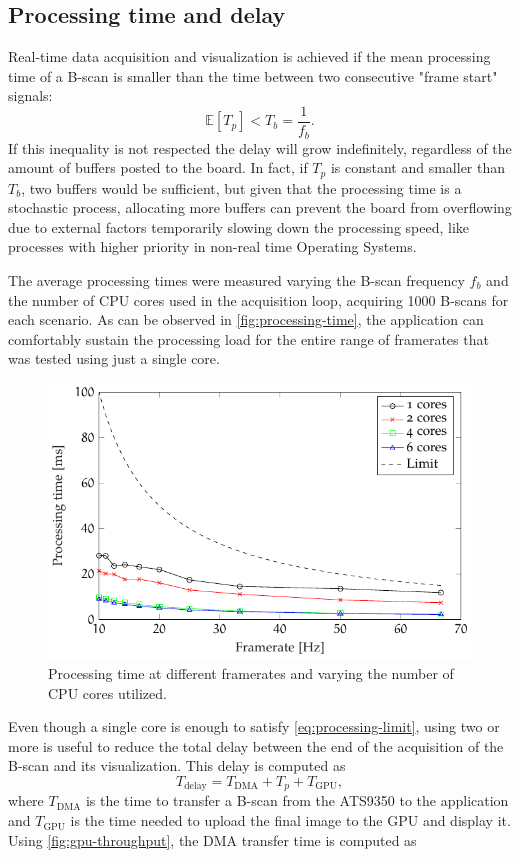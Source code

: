 \subsection{Processing time and delay}
Real-time data acquisition and visualization is achieved if the mean processing time of a B-scan is smaller than the time between two consecutive "frame start" signals:
\begin{equation}\label{eq:processing-limit}
	\mathbb{E}[T_p] < T_b = \frac{1}{f_b}.
\end{equation}
If this inequality is not respected the delay will grow indefinitely, regardless of the amount of buffers posted to the board. In fact, if $T_p$ is constant and smaller than $T_b$, two buffers would be sufficient, but given that the processing time is a stochastic process, allocating more buffers can prevent the board from overflowing due to external factors temporarily slowing down the processing speed, like processes with higher priority in non-real time Operating Systems. 

The average processing times were measured varying the B-scan frequency $f_b$ and the number of CPU cores used in the acquisition loop, acquiring 1000 B-scans for each scenario. As can be observed in \autoref{fig:processing-time}, the application can comfortably sustain the processing load for the entire range of framerates that was tested using just a single core. 

\begin{figure}[htb]
	\myfloatalign
	\includegraphics[width=0.8\linewidth]{gfx/ch4/processing-time}
	\caption{Processing time at different framerates and varying the number of CPU cores utilized.}\label{fig:processing-time}
\end{figure}

Even though a single core is enough to satisfy \autoref{eq:processing-limit}, using two or more is useful to reduce the total delay between the end of the acquisition of the B-scan and its visualization. This delay is computed as 
\begin{equation}
T_{\text{delay}} = T_{\text{DMA}} + T_p + T_{\text{GPU}},
\end{equation}
where $T_{\text{DMA}}$ is the time to transfer a B-scan from the ATS9350 to the application and $T_{\text{GPU}}$ is the time needed to upload the final image to the GPU and display it. Using \autoref{fig:gpu-throughput}, the DMA transfer time is computed as 

